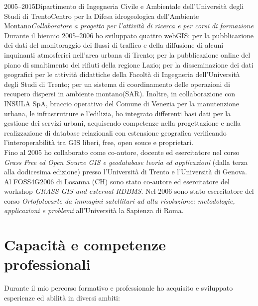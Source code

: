 \documentclass{curriculum}
\begin{document}
    \begin{entrylist}
    \entry
        {2005--2015}{Dipartimento di Ingegneria Civile e Ambientale dell'Università degli Studi di Trento}{Centro per la Difesa idrogeologica dell'Ambiente Montano}{\emph{Collaboratore a progetto per l'attività di ricerca e per corsi di formazione}\hfill\vspace{3pt}\\
        Durante il biennio 2005--2006 ho sviluppato quattro webGIS: per la pubblicazione dei dati del monitoraggio dei flussi di traffico e  della diffusione di alcuni inquinanti atmosferici nell'area urbana di Trento; per la pubblicazione online del piano di smaltimento dei rifiuti della regione Lazio; per la disseminazione dei dati geografici per le attività didattiche della Facoltà di Ingegneria dell'Università degli Studi di Trento; per un sistema di coordinamento delle operazioni di recupero dispersi in ambiente montano(SAR). Inoltre, in collaborazione con INSULA SpA, braccio operativo del Comune di Venezia per la manutenzione urbana, le infrastrutture e l'edilizia, ho integrato differenti basi dati per la gestione dei servizi urbani, acquisendo competenze nella progettazione e nella realizzazione di database relazionali con estensione geografica verificando l'interoperabilità tra GIS liberi, free, open souce e proprietari.
        \\Fino al 2005 ho collaborato come co-autore, docente ed esercitatore nel corso \textit{Grass Free ed Open Source GIS e geodatabase teoria ed applicazioni} (dalla terza alla dodicesima edizione) presso l'Università di Trento e l'Università di Genova. Al FOSS4G2006 di Losanna (CH) sono stato co-autore ed esercitatore del workshop \textit{GRASS GIS and external RDBMS}. 
        Nel 2006 sono stato esercitatore del corso \textit{Ortofotocarte da immagini satellitari ad alta risoluzione: metodologie, applicazioni e problemi} all'Università la Sapienza di Roma.}
    \end{entrylist}
    
    \section{Capacità e competenze professionali}
        Durante il mio percorso formativo e professionale ho acquisito e sviluppato esperienze ed abilità in diversi ambiti:
        
\end{document}
